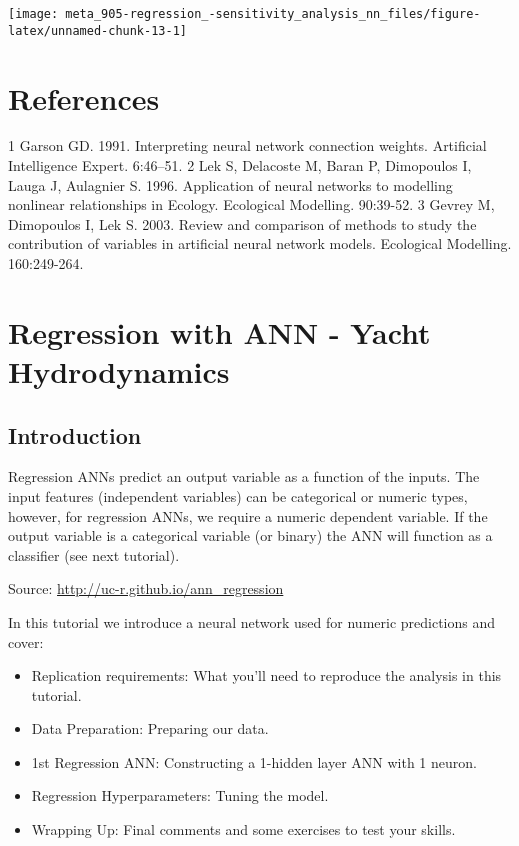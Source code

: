 \documentclass[]{book}
\providecommand{\tightlist}{%
  \setlength{\itemsep}{0pt}\setlength{\parskip}{0pt}}
\begin{document}
\begin{center}\texttt{[image: meta\_905-regression\_-sensitivity\_analysis\_nn\_files/figure-latex/unnamed-chunk-13-1]} \end{center}

\hypertarget{references}{%
\chapter{References}\label{references}}

1 Garson GD. 1991. Interpreting neural network connection weights. Artificial Intelligence Expert. 6:46--51.
2 Lek S, Delacoste M, Baran P, Dimopoulos I, Lauga J, Aulagnier S. 1996. Application of neural networks to modelling nonlinear relationships in Ecology. Ecological Modelling. 90:39-52.
3 Gevrey M, Dimopoulos I, Lek S. 2003. Review and comparison of methods to study the contribution of variables in artificial neural network models. Ecological Modelling. 160:249-264.

\hypertarget{regression-with-ann---yacht-hydrodynamics}{%
\chapter{Regression with ANN - Yacht Hydrodynamics}\label{regression-with-ann---yacht-hydrodynamics}}

\hypertarget{introduction-5}{%
\section{Introduction}\label{introduction-5}}

Regression ANNs predict an output variable as a function of the inputs. The input features (independent variables) can be categorical or numeric types, however, for regression ANNs, we require a numeric dependent variable. If the output variable is a categorical variable (or binary) the ANN will function as a classifier (see next tutorial).

Source: \url{http://uc-r.github.io/ann_regression}

In this tutorial we introduce a neural network used for numeric predictions and cover:

\begin{itemize}
\tightlist
\item
  Replication requirements: What you'll need to reproduce the analysis in this tutorial.
\item
  Data Preparation: Preparing our data.
\item
  1st Regression ANN: Constructing a 1-hidden layer ANN with 1 neuron.
\item
  Regression Hyperparameters: Tuning the model.
\item
  Wrapping Up: Final comments and some exercises to test your skills.
\end{itemize}
\end{document}
